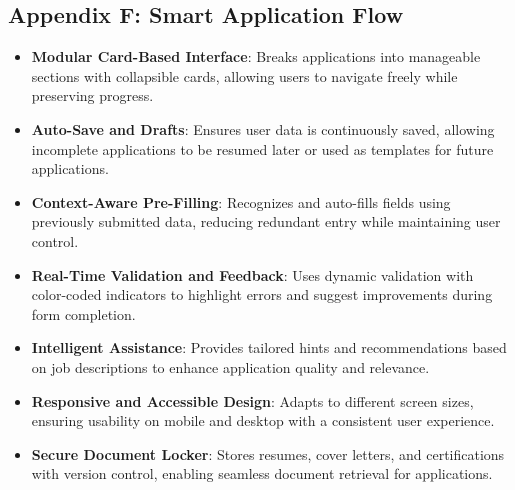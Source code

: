 \documentclass[
	letterpaper, %
]{jdf}
\begin{document}
\subsection{Appendix F: Smart Application Flow}
\begin{itemize}
    \item \textbf{Modular Card-Based Interface}: Breaks applications into manageable sections with collapsible cards, allowing users to navigate freely while preserving progress.
    \item \textbf{Auto-Save and Drafts}: Ensures user data is continuously saved, allowing incomplete applications to be resumed later or used as templates for future applications.
    \item \textbf{Context-Aware Pre-Filling}: Recognizes and auto-fills fields using previously submitted data, reducing redundant entry while maintaining user control.
    \item \textbf{Real-Time Validation and Feedback}: Uses dynamic validation with color-coded indicators to highlight errors and suggest improvements during form completion.
    \item \textbf{Intelligent Assistance}: Provides tailored hints and recommendations based on job descriptions to enhance application quality and relevance.
    \item \textbf{Responsive and Accessible Design}: Adapts to different screen sizes, ensuring usability on mobile and desktop with a consistent user experience.
    \item \textbf{Secure Document Locker}: Stores resumes, cover letters, and certifications with version control, enabling seamless document retrieval for applications.
\end{itemize}
\end{document}
